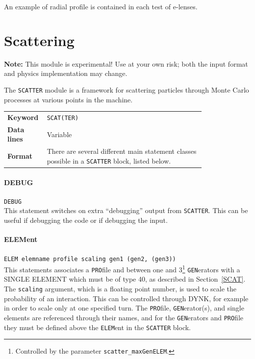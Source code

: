 An example of radial profile is contained in each test of e-lenses.

\section{Scattering} \label{sec:scatter}

\textcolor{notered}{\textbf{Note:} This module is experimental! Use at your own risk; both the input format and physics implementation may change.}

\bigskip
The \texttt{SCATTER} module is a framework for scattering particles through Monte Carlo processes at various points in the machine.

\bigskip
\begin{tabular}{@{}lp{0.8\linewidth}}
    \textbf{Keyword}    & \texttt{SCAT(TER)}\index{SCAT} \\
    \textbf{Data lines} & Variable \\
    \textbf{Format}     & There are several different main statement classes possible in a \texttt{SCATTER} block, listed below.
\end{tabular}

\bigskip

\paragraph{DEBUG} \texttt{DEBUG}\\

This statement switches on extra ``debugging'' output from \texttt{SCATTER}.
This can be useful if debugging the code or if debugging the input.

\paragraph{ELEMent} \texttt{ELEM elemname profile scaling gen1 (gen2, (gen3))}\\

This statements associates a \texttt{PRO}file and between one and 3\footnote{Controlled by the parameter \texttt{scatter\_maxGenELEM}.} \texttt{GEN}erators with a SINGLE ELEMENT which must be of type 40, as described in Section~\ref{SCAT}.
The \texttt{scaling} argument, which is a floating point number, is used to scale the probability of an interaction.
This can be controlled through DYNK, for example in order to scale only at one specified turn.
The \texttt{PRO}file, \texttt{GEN}erator(s), and single elements are referenced through their names, and for the \texttt{GEN}erators and \texttt{PRO}file they must be defined above the \texttt{ELEM}ent in the \texttt{SCATTER} block.

